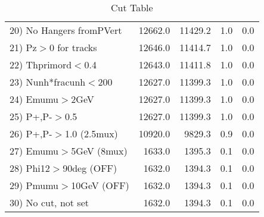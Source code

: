 \begin{table}[h!]
\begin{tabular}{||l||r|r|r|r||}
 20) No Hangers fromPVert &     12662.0 &     11429.2 &         1.0 &         0.0 \\
 21) Pz$>$0 for tracks    &     12646.0 &     11414.7 &         1.0 &         0.0 \\
 22) Thprimord$<$0.4      &     12643.0 &     11411.8 &         1.0 &         0.0 \\
 23) Nunh*fracunh$<$200   &     12627.0 &     11399.3 &         1.0 &         0.0 \\
 24) Emumu$>$2GeV         &     12627.0 &     11399.3 &         1.0 &         0.0 \\
 25) P+,P-$>$0.5          &     12627.0 &     11399.3 &         1.0 &         0.0 \\
 26) P+,P-$>$1.0 (2.5mux) &     10920.0 &      9829.3 &         0.9 &         0.0 \\
 27) Emumu$>$5GeV  (8mux) &      1633.0 &      1395.3 &         0.1 &         0.0 \\
 28) Phi12$>$90deg  (OFF) &      1632.0 &      1394.3 &         0.1 &         0.0 \\
 29) Pmumu$>$10GeV  (OFF) &      1632.0 &      1394.3 &         0.1 &         0.0 \\
 30) No cut, not set      &      1632.0 &      1394.3 &         0.1 &         0.0 \\
 \hline
 \hline
 \end{tabular}
 \caption{Cut Table \cohjp  }
 \label{tab-cut__jpsi}
 \end{table}
